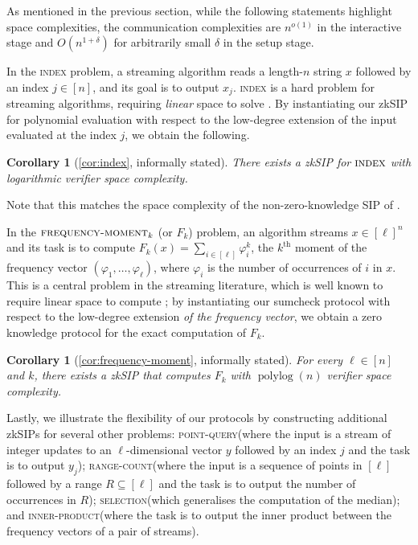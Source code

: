 \documentclass[10pt,a4paper]{article}
\newtheorem{corollary}[theorem]{Corollary}
\theoremstyle{definition}
\newcommand{\zksip}{\textrm{zkSIP}}
\newcommand{\polylog}{\operatorname{polylog}}
\newcommand{\indexproblem}{\normalfont\textsc{index}\xspace}
\newcommand{\frequencymoment}{\normalfont\textsc{frequency-moment}\xspace}
\newcommand{\pointquery}{\normalfont\textsc{point-query}\xspace}
\newcommand{\rangecount}{\normalfont\textsc{range-count}\xspace}
\newcommand{\selection}{\normalfont\textsc{selection}\xspace}
\newcommand{\innerproductproblem}{\normalfont\textsc{inner-product}\xspace}
\begin{document}
As mentioned in the previous section, while the following statements highlight space complexities, the communication complexities are $n^{o(1)}$ in the interactive stage and $O(n^{1 + \delta})$ for arbitrarily small $\delta$ in the setup stage.

In the \indexproblem problem, a streaming algorithm reads a length-$n$ string $x$ followed by an index $j \in [n]$, and its goal is to output $x_j$. \indexproblem is a hard problem for streaming algorithms, requiring \emph{linear} space to solve \cite{RY20}. By instantiating our \zksip{} for polynomial evaluation with respect to the low-degree extension of the input evaluated at the index $j$, we obtain the following.

\begin{corollary}[\cref{cor:index}, informally stated]
    \label{infcor:index}
    There exists a \zksip{} for $\indexproblem$ with logarithmic verifier space complexity.
\end{corollary}
\noindent Note that this matches the space complexity of the non-zero-knowledge SIP of \cite{CCMTV15, CCMTV19}.

In the $\frequencymoment_k$ (or $F_k$) problem, an algorithm streams $x \in [\ell]^n$ and its task is to compute $F_k(x) = \sum_{i \in [\ell]} \varphi_i^k$, the $k^\text{th}$ moment of the frequency vector $(\varphi_1,\ldots,\varphi_\ell)$, where $\varphi_i$ is the number of occurrences of $i$ in $x$. This is a central problem in the streaming literature, which is well known to require linear space to compute \cite{AMS99}; by instantiating our sumcheck protocol with respect to the low-degree extension \emph{of the frequency vector}, we obtain a zero knowledge protocol for the exact computation of $F_k$.

\begin{corollary}[\cref{cor:frequency-moment}, informally stated]
    \label{infcor:frequency-moment}
    For every $\ell \in [n]$ and $k$, there exists a \zksip{} that computes $F_k$ with $\polylog(n)$ verifier space complexity.
\end{corollary}

Lastly, we illustrate the flexibility of our protocols by constructing additional \zksip{}s for several other problems: \pointquery (where the input is a stream of integer updates to an $\ell$-dimensional vector $y$ followed by an index $j$ and the task is to output $y_j$); \rangecount (where the input is a sequence of points in $[\ell]$ followed by a range $R \subseteq [\ell]$ and the task is to output the number of occurrences in $R$); \selection (which generalises the computation of the median); and \innerproductproblem (where the task is to output the inner product between the frequency vectors of a pair of streams).
\end{document}
